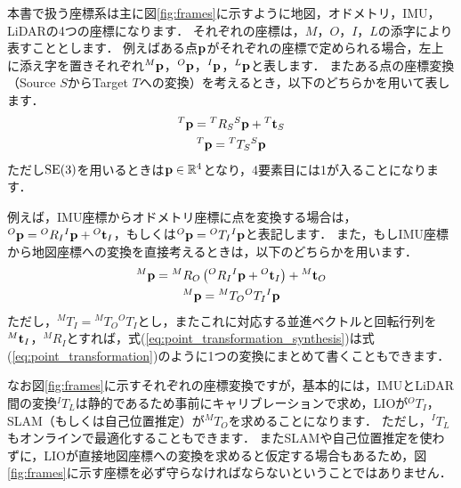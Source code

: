 本書で扱う座標系は主に図\ref{fig:frames}に示すように地図，オドメトリ，IMU，LiDARの4つの座標になります．
それぞれの座標は，$M$，$O$，$I$，$L$の添字により表すこととします．
例えばある点${\bf p}$がそれぞれの座標で定められる場合，左上に添え字を置きそれぞれ${}^{M}{\bf p}$，${}^{O}{\bf p}$，${}^{I}{\bf p}$，${}^{L}{\bf p}$と表します．
またある点の座標変換（Source $S$からTarget $T$への変換）を考えるとき，以下のどちらかを用いて表します．
%
\begin{align}
  \begin{gathered}
    {}^{T}{\bf p} = {}^{T}R_{S} {}^{S}{\bf p} + {}^{T}{\bf t}_{S} \\
%
    {}^{T}{\bf p} = {}^{T}T_{S} {}^{S}{\bf p}
  \end{gathered}
  \label{eq:point_transformation}
\end{align}
%
ただし${\rm SE}(3)$を用いるときは${\bf p} \in \mathbb{R}^{4}$となり，4要素目には1が入ることになります．

例えば，IMU座標からオドメトリ座標に点を変換する場合は，${}^{O}{\bf p} = {}^{O}R_{I} {}^{I}{\bf p} + {}^{O}{\bf t}_{I}$，もしくは${}^{O}{\bf p} = {}^{O}T_{I} {}^{I}{\bf p}$と表記します．
また，もしIMU座標から地図座標への変換を直接考えるときは，以下のどちらかを用います．
%
\begin{align}
  \begin{gathered}
    {}^{M}{\bf p} = {}^{M}R_{O} \left( {}^{O}R_{I} {}^{I}{\bf p} + {}^{O}{\bf t}_{I} \right) + {}^{M}{\bf t}_{O}\\
%
    {}^{M}{\bf p} = {}^{M}T_{O} {}^{O}T_{I} {}^{I}{\bf p}
  \end{gathered}
  \label{eq:point_transformation_synthesis}
\end{align}
%
ただし，${}^{M}T_{I} = {}^{M}T_{O} {}^{O}T_{I}$とし，またこれに対応する並進ベクトルと回転行列を${}^{M}{\bf t}_{I}$，${}^{M}R_{I}$とすれば，式(\ref{eq:point_transformation_synthesis})は式(\ref{eq:point_transformation})のように1つの変換にまとめて書くこともできます．

なお図\ref{fig:frames}に示すそれぞれの座標変換ですが，基本的には，IMUとLiDAR間の変換${}^{I}T_{L}$は静的であるため事前にキャリブレーションで求め，LIOが${}^{O}T_{I}$，SLAM（もしくは自己位置推定）が${}^{M}T_{O}$を求めることになります．
ただし，${}^{I}T_{L}$もオンラインで最適化することもできます．
またSLAMや自己位置推定を使わずに，LIOが直接地図座標への変換を求めると仮定する場合もあるため，図\ref{fig:frames}に示す座標を必ず守らなければならないということではありません．


